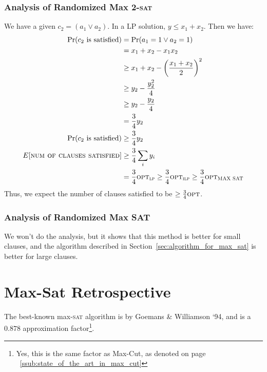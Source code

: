                 \subsubsection{Analysis of Randomized Max 2-\textsc{sat}} %
                \label{ssub:analysis_of_randomized_max_2_sat}
                    We have a given $c_2 = (a_1 \lor a_2)$.
                    In a LP solution, $y \le x_1 + x_2$.
                    Then we have:
                    \begin{align*}
                        \text{Pr}(\text{$c_2$ is satisfied}) &= \text{Pr}(a_1 = 1 \lor a_2 = 1) \\
                        &= x_1 + x_2 - x_1 x_2 \\
                        &\ge x_1 + x_2 - \left( \frac{x_1 + x_2}{2} \right)^2 \\
                        &\ge y_2 - \frac{y_2^2}{4} \\
                        &\ge y_2 - \frac{y_2}{4} \\
                        &= \frac{3}{4} y_2 \\
                        \text{Pr}(\text{$c_2$ is satisfied}) &\ge \frac{3}{4} y_2 \\
                        E[\textsc{num of clauses satisfied}] &\ge \frac{3}{4} \sum_i y_i \\
                        &= \frac{3}{4} \textsc{opt}_{\textsc{lp}}
                        \ge \frac{3}{4} \textsc{opt}_{\textsc{ilp}}
                        \ge \frac{3}{4} \textsc{opt}_{\textsc{MAX SAT}} \\
                    \end{align*}
                    Thus, we expect the number of clauses satisfied to be $\ge \frac{3}{4} \textsc{opt}$.
                \subsubsection{Analysis of Randomized Max SAT} %
                \label{ssub:analysis_of_randomized_max_sat}
                    We won't do the analysis, but it shows that this method is better for small clauses, and the algorithm described in Section~\ref{sec:algorithm_for_max_sat} is better for large clauses.
            \section{Max-Sat Retrospective} %
            \label{sec:max_sat_retrospective}
                The best-known max-\textsc{sat} algorithm is by Goemans \& Williamson `94, and is a $0.878$ approximation factor\footnote{Yes, this is the same factor as Max-Cut, as denoted on page ~\ref{ssub:state_of_the_art_in_max_cut}}.

